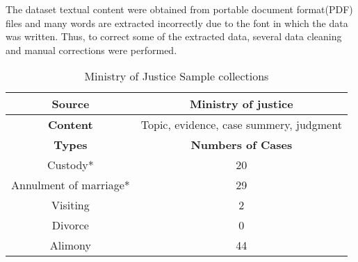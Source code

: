 \documentclass[sn-mathphys,Numbered]{sn-jnl}%
\theoremstyle{thmstyleone}%
\theoremstyle{thmstyletwo}%
\theoremstyle{thmstylethree}%
\begin{document}
The dataset textual content were obtained from portable document format(PDF) files and many words are extracted incorrectly due to the font in which the data was written.  Thus, to correct some of the extracted data, several data cleaning and manual corrections were performed. %

\begin{table}[h]
\begin{tabular}{|c|c|}
 \hline
 \textbf{Source}&Ministry of justice\\
 \hline
 \textbf{Content}& Topic, evidence, case summery, judgment\\
 \hline
 \textbf{Types} & \textbf{Numbers of Cases}\\ 
 \hline
 Custody*&20\\
 \hline
 Annulment of marriage*&29\\
 \hline
 Visiting&2\\
 \hline
 Divorce&0\\
 \hline
 Alimony&44\\
 \hline
\end{tabular}
\caption{Ministry of Justice Sample collections}
\label{Ministry of Justice dataset}
\end{table}






\end{document}
